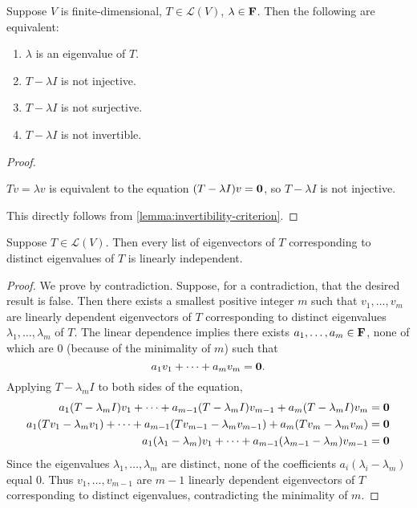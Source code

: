 \begin{lemma}
Suppose $V$ is finite-dimensional, $T\in\mathcal{L}(V)$, $\lambda\in\mathbf F$. Then the following are equivalent:
\begin{enumerate}[label=(\roman*)]
\item $\lambda$ is an eigenvalue of $T$.
\item $T-\lambda I$ is not injective.
\item $T-\lambda I$ is not surjective.
\item $T-\lambda I$ is not invertible.
\end{enumerate}
\end{lemma}

\begin{proof} \

 $Tv=\lambda v$ is equivalent to the equation $(T-\lambda I)v=\vb{0}$, so $T-\lambda I$ is not injective.

 This directly follows from \cref{lemma:invertibility-criterion}.
\end{proof}

\begin{proposition}\label{prop:eigenvectors-linind}
Suppose $T\in\mathcal{L}(V)$. Then every list of eigenvectors of $T$ corresponding to distinct eigenvalues of $T$ is linearly independent.
\end{proposition}

\begin{proof}
We prove by contradiction. Suppose, for a contradiction, that the desired result is false. Then there exists a smallest positive integer $m$ such that $v_1,\dots,v_m$ are linearly dependent eigenvectors of $T$ corresponding to distinct eigenvalues $\lambda_1,\dots,\lambda_m$ of $T$. The linear dependence implies there exists $a_1,\dots,a_m\in\mathbf F$, none of which are $0$ (because of the minimality of $m$) such that
\[a_1v_1+\cdots+a_mv_m=\vb{0}.\]
Applying $T-\lambda_mI$ to both sides of the equation,
\begin{align*}
a_1(T-\lambda_mI)v_1+\cdots+a_{m-1}(T-\lambda_mI)v_{m-1}+a_m(T-\lambda_mI)v_m&=\vb{0}\\
a_1(Tv_1-\lambda_mv_1)+\cdots+a_{m-1}(Tv_{m-1}-\lambda_mv_{m-1})+a_m(Tv_m-\lambda_mv_m)&=\vb{0}\\
a_1(\lambda_1-\lambda_m)v_1+\cdots+a_{m-1}(\lambda_{m-1}-\lambda_m)v_{m-1}&=\vb{0}
\end{align*}
Since the eigenvalues $\lambda_1,\dots,\lambda_m$ are distinct, none of the coefficients $a_i(\lambda_i-\lambda_m)$ equal $0$. Thus $v_1,\dots,v_{m-1}$ are $m-1$ linearly dependent eigenvectors of $T$ corresponding to distinct eigenvalues, contradicting the minimality of $m$.
\end{proof}


